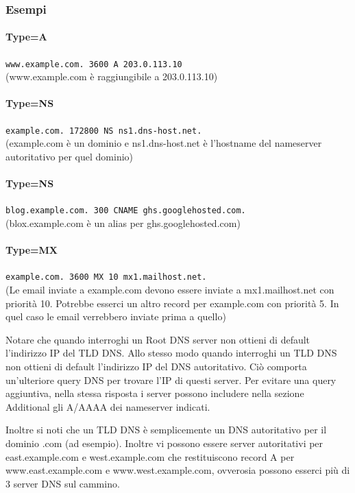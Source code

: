 \documentclass{book}
\begin{document}
\subsubsection*{Esempi}
\paragraph{Type=A}
\texttt{www.example.com.   3600   A     203.0.113.10} \\ (www.example.com è raggiungibile a 203.0.113.10)

\paragraph{Type=NS}
\texttt{example.com.       172800 NS    ns1.dns-host.net.} \\ (example.com è un dominio e ns1.dns-host.net è l'hostname del nameserver autoritativo per quel dominio)

\paragraph{Type=NS}
\texttt{blog.example.com.  300    CNAME  ghs.googlehosted.com.} \\ (blox.example.com è un alias per ghs.googlehosted.com)

\paragraph{Type=MX}
\texttt{example.com.       3600   MX    10  mx1.mailhost.net.} \\
(Le email inviate a example.com devono essere inviate a mx1.mailhost.net con priorità 10. Potrebbe esserci un altro record per example.com con priorità 5. In quel caso le email verrebbero inviate prima a quello)

Notare che quando interroghi un Root DNS server non ottieni di default l'indirizzo IP del TLD DNS. Allo stesso modo quando interroghi un TLD DNS non ottieni di default l'indirizzo IP del DNS autoritativo. Ciò comporta un'ulteriore query DNS per trovare l'IP di questi server. Per evitare una query aggiuntiva, nella stessa risposta i server possono includere nella sezione Additional gli A/AAAA dei nameserver indicati.

Inoltre si noti che un TLD DNS è semplicemente un DNS autoritativo per il dominio .com (ad esempio). Inoltre vi possono essere server autoritativi per east.example.com e west.example.com che restituiscono record A per www.east.example.com e www.west.example.com, ovverosia possono esserci più di 3 server DNS sul cammino.
\end{document}
